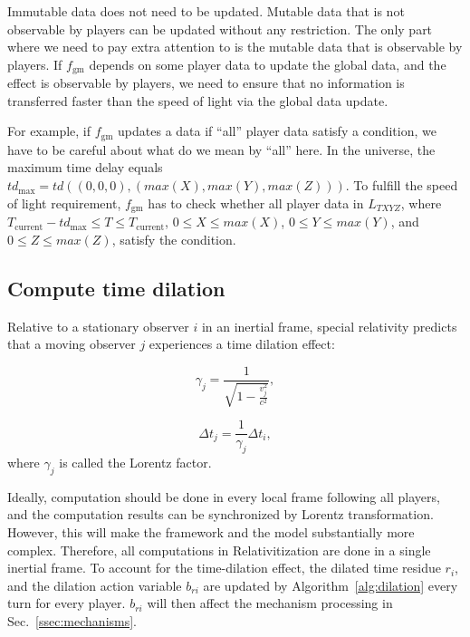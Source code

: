 \documentclass{article}
\begin{document}
Immutable data does not need to be updated.
Mutable data that is not observable by players can be updated without any restriction.
The only part where we need to pay extra attention to is the mutable data that is observable by players.
If $f_{\textrm{gm}}$ depends on some player data to update the global data, 
and the effect is observable by players,
we need to ensure that no information is transferred faster than the speed of light via
the global data update.

For example, if $f_{\textrm{gm}}$ updates a data if ``all'' player data satisfy a condition,
we have to be careful about what do we mean by ``all'' here.
In the universe, the maximum time delay equals $td_{\textrm{max}} = td((0, 0, 0), (max(X), max(Y), max(Z)))$.
To fulfill the speed of light requirement, $f_{\textrm{gm}}$ has to check whether all player data in
$L_{TXYZ}$, where $T_{\textrm{current}} - td_{\textrm{max}} \leq T \leq T_{\textrm{current}}$,
$0 \leq X \leq max(X)$, $0 \leq Y \leq max(Y)$, and $0 \leq Z \leq max(Z)$,
satisfy the condition.

\subsection{Compute time dilation} \label{ssec:dilation}

Relative to a stationary observer $i$ in an inertial frame,
special relativity predicts that a moving observer $j$ experiences a time dilation effect:

\begin{equation} \label{eq:gamma}
  \gamma_j = \frac{1}{\sqrt{1 - \frac{v_j^2}{c^2}}},
\end{equation}

\begin{equation}
  \Delta t_j = \frac{1}{\gamma_j} \Delta t_i,
\end{equation}
where $\gamma_j$ is called the Lorentz factor.

Ideally, computation should be done in every local frame following all players, 
and the computation results can be synchronized by Lorentz transformation.
However, this will make the framework and the model substantially more complex.
Therefore, all computations in Relativitization are done in a single inertial frame.
To account for the time-dilation effect, the dilated time residue $r_i$, 
and the dilation action variable $b_{ri}$ are updated by Algorithm~\ref{alg:dilation}
every turn for every player. 
$b_{ri}$ will then affect the mechanism processing in Sec.~\ref{ssec:mechanisms}.
\end{document}
